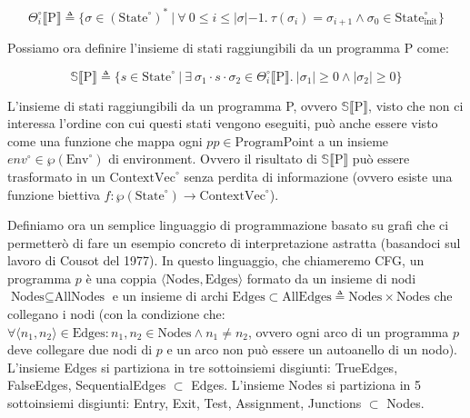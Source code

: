 \documentclass{article}
\newcommand{\envcirc}{\textrm{Env}^{\circ}}
\newcommand{\statecirc}{\textrm{State}^{\circ}}
\newcommand{\cvcirc}{\textrm{ContextVec}^{\circ}}
\begin{document}
\[\Theta^{\circ}_i\llbracket\textrm{P}\rrbracket\triangleq\{\sigma\in(\statecirc)^{\ast}\ |\ \forall\ 0\leq i\leq |\sigma|-1.\ \tau(\sigma_i)=\sigma_{i+1} \wedge \sigma_0\in\statecirc_{\textrm{init}}\}\]

Possiamo ora definire l'insieme di stati raggiungibili da un programma P come:

\[\mathbb{S}\llbracket\textrm{P}\rrbracket\triangleq\{s\in\statecirc\ |\ \exists\ \sigma_1\cdot s\cdot \sigma_2\in\Theta^{\circ}_i\llbracket\textrm{P}\rrbracket.\ |\sigma_1|\geq 0 \wedge |\sigma_2|\geq 0\}\]

L'insieme di stati raggiungibili da un programma P, ovvero \(\mathbb{S}\llbracket\textrm{P}\rrbracket\), visto che non ci interessa l'ordine con cui questi stati vengono eseguiti, può anche essere visto come una funzione che mappa ogni \(pp\in\textrm{ProgramPoint}\) a un insieme \(env^{\circ}\in\wp(\envcirc)\) di environment. Ovvero il risultato di  \(\mathbb{S}\llbracket\textrm{P}\rrbracket\) può essere trasformato in un \(\cvcirc\) senza perdita di informazione (ovvero esiste una funzione biettiva  \(f:\wp(\statecirc)\rightarrow\cvcirc\)).

Definiamo ora un semplice linguaggio di programmazione basato su grafi che ci permetterò di fare un esempio concreto di interpretazione astratta (basandoci sul lavoro di Cousot del 1977). In questo linguaggio, che chiameremo CFG, un programma \(p\) è una coppia \(\langle\textrm{Nodes}, \textrm{Edges}\rangle\) formato da un insieme di nodi \(\textrm{Nodes}\subseteq\textrm{AllNodes}\) e un insieme di archi \(\textrm{Edges}\subset\textrm{AllEdges}\triangleq\textrm{Nodes}\times\textrm{Nodes}\) che collegano i nodi (con la condizione che: \(\forall \langle n_1, n_2\rangle\in \textrm{Edges} :n_1, n_2\in \textrm{Nodes} \wedge n_1\neq n_2\), ovvero ogni arco di un programma \(p\) deve collegare due nodi di \(p\) e un arco non può essere un autoanello di un nodo). L'insieme Edges si partiziona in tre sottoinsiemi disgiunti: TrueEdges, FalseEdges, SequentialEdges \(\subset\) Edges. L'insieme Nodes si partiziona in 5 sottoinsiemi disgiunti: Entry, Exit, Test, Assignment, Junctions \(\subset\) Nodes.
\end{document}
